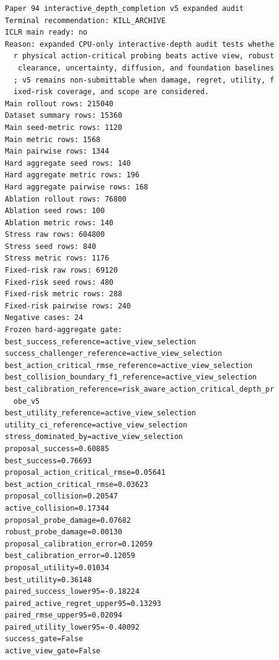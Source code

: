 \documentclass{article}
\begin{document}
\begin{verbatim}
Paper 94 interactive_depth_completion v5 expanded audit
Terminal recommendation: KILL_ARCHIVE
ICLR main ready: no
Reason: expanded CPU-only interactive-depth audit tests whethe
  r physical action-critical probing beats active view, robust
   clearance, uncertainty, diffusion, and foundation baselines
  ; v5 remains non-submittable when damage, regret, utility, f
  ixed-risk coverage, and scope are considered.
Main rollout rows: 215040
Dataset summary rows: 15360
Main seed-metric rows: 1120
Main metric rows: 1568
Main pairwise rows: 1344
Hard aggregate seed rows: 140
Hard aggregate metric rows: 196
Hard aggregate pairwise rows: 168
Ablation rollout rows: 76800
Ablation seed rows: 100
Ablation metric rows: 140
Stress raw rows: 604800
Stress seed rows: 840
Stress metric rows: 1176
Fixed-risk raw rows: 69120
Fixed-risk seed rows: 480
Fixed-risk metric rows: 288
Fixed-risk pairwise rows: 240
Negative cases: 24
Frozen hard-aggregate gate:
best_success_reference=active_view_selection
success_challenger_reference=active_view_selection
best_action_critical_rmse_reference=active_view_selection
best_collision_boundary_f1_reference=active_view_selection
best_calibration_reference=risk_aware_action_critical_depth_pr
  obe_v5
best_utility_reference=active_view_selection
utility_ci_reference=active_view_selection
stress_dominated_by=active_view_selection
proposal_success=0.60885
best_success=0.76693
proposal_action_critical_rmse=0.05641
best_action_critical_rmse=0.03623
proposal_collision=0.20547
active_collision=0.17344
proposal_probe_damage=0.07682
robust_probe_damage=0.00130
proposal_calibration_error=0.12059
best_calibration_error=0.12059
proposal_utility=0.01034
best_utility=0.36148
paired_success_lower95=-0.18224
paired_active_regret_upper95=0.13293
paired_rmse_upper95=0.02094
paired_utility_lower95=-0.40092
success_gate=False
active_view_gate=False
\end{verbatim}
\end{document}
